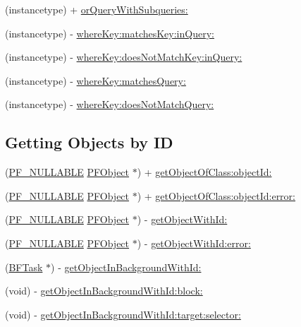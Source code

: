  

 \begin{DoxyCompactItemize}
\item 
(instancetype) + \hyperlink{interface_p_f_query_a9b17ca34d3c2957b01c13759d3898b98}{or\+Query\+With\+Subqueries\+:}
\item 
(instancetype) -\/ \hyperlink{interface_p_f_query_a2d326dd2c4b51b51584639bad2011ddb}{where\+Key\+:matches\+Key\+:in\+Query\+:}
\item 
(instancetype) -\/ \hyperlink{interface_p_f_query_ac23f13daa66a5a5184701f65c80bb580}{where\+Key\+:does\+Not\+Match\+Key\+:in\+Query\+:}
\item 
(instancetype) -\/ \hyperlink{interface_p_f_query_a3ddddf33aa0ba61381fcb639732ba12c}{where\+Key\+:matches\+Query\+:}
\item 
(instancetype) -\/ \hyperlink{interface_p_f_query_a89869b9919022efec5fcce25b686a6f0}{where\+Key\+:does\+Not\+Match\+Query\+:}
\end{DoxyCompactItemize}
\subsection*{Getting Objects by I\+D}
\label{_amgrp0fc02a0b780903ff392d477117d2b5f1}%


 

 \begin{DoxyCompactItemize}
\item 
(\hyperlink{_p_f_nullability_8h_a528d97a96c5fb279a45c378f5657fca2}{P\+F\+\_\+\+N\+U\+L\+L\+A\+B\+L\+E} \hyperlink{interface_p_f_object}{P\+F\+Object} $\ast$) + \hyperlink{interface_p_f_query_a92b7b9e4763b44090550b38b6a6dc0b8}{get\+Object\+Of\+Class\+:object\+Id\+:}
\item 
(\hyperlink{_p_f_nullability_8h_a528d97a96c5fb279a45c378f5657fca2}{P\+F\+\_\+\+N\+U\+L\+L\+A\+B\+L\+E} \hyperlink{interface_p_f_object}{P\+F\+Object} $\ast$) + \hyperlink{interface_p_f_query_acea4613749389a065e0a3f19f1ce10e0}{get\+Object\+Of\+Class\+:object\+Id\+:error\+:}
\item 
(\hyperlink{_p_f_nullability_8h_a528d97a96c5fb279a45c378f5657fca2}{P\+F\+\_\+\+N\+U\+L\+L\+A\+B\+L\+E} \hyperlink{interface_p_f_object}{P\+F\+Object} $\ast$) -\/ \hyperlink{interface_p_f_query_a7ccf54ec7047415c46a848ddb8373805}{get\+Object\+With\+Id\+:}
\item 
(\hyperlink{_p_f_nullability_8h_a528d97a96c5fb279a45c378f5657fca2}{P\+F\+\_\+\+N\+U\+L\+L\+A\+B\+L\+E} \hyperlink{interface_p_f_object}{P\+F\+Object} $\ast$) -\/ \hyperlink{interface_p_f_query_ab0be96061737893be70d2084025a1f55}{get\+Object\+With\+Id\+:error\+:}
\item 
(\hyperlink{interface_b_f_task}{B\+F\+Task} $\ast$) -\/ \hyperlink{interface_p_f_query_a3aa8aa383d651c64876c5985fcd72329}{get\+Object\+In\+Background\+With\+Id\+:}
\item 
(void) -\/ \hyperlink{interface_p_f_query_a81ee01875fba03e3ae9c8b3a10b05e35}{get\+Object\+In\+Background\+With\+Id\+:block\+:}
\item 
(void) -\/ \hyperlink{interface_p_f_query_afe4f0e9e37ef8cb121666da0eddd9529}{get\+Object\+In\+Background\+With\+Id\+:target\+:selector\+:}
\end{DoxyCompactItemize}
